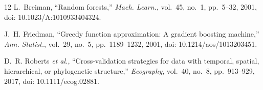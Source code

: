 \documentclass[journal]{IEEEtran}
\begin{document}
\begin{thebibliography}{12}
L.~Breiman, ``Random forests,'' \emph{Mach. Learn.}, vol.~45, no.~1, pp.~5--32, 2001,
doi: 10.1023/A:1010933404324.

J.~H. Friedman, ``Greedy function approximation: A gradient boosting machine,''
\emph{Ann. Statist.}, vol.~29, no.~5, pp.~1189--1232, 2001, doi: 10.1214/aos/1013203451.

D.~R. Roberts \emph{et al.}, ``Cross-validation strategies for data with temporal, spatial,
hierarchical, or phylogenetic structure,'' \emph{Ecography}, vol.~40, no.~8, pp.~913--929, 2017,
doi: 10.1111/ecog.02881.

\end{thebibliography}
\end{document}
